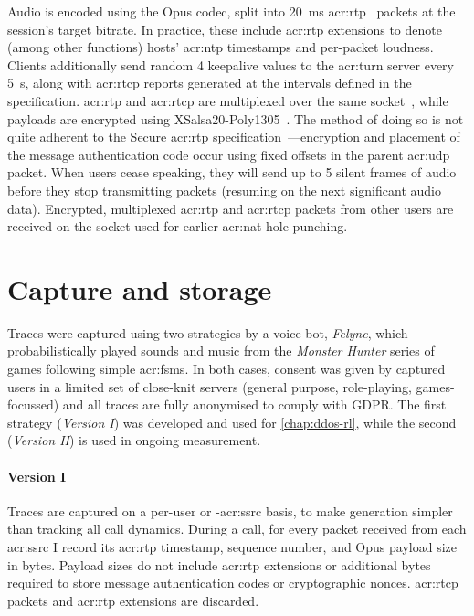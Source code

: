 Audio is encoded using the Opus codec, split into \qty{20}{\milli\second} \gls{acr:rtp}~\parencite{rfc3550} packets at the session's target bitrate.
In practice, these include \gls{acr:rtp} extensions to denote (among other functions) hosts' \gls{acr:ntp} timestamps and per-packet loudness.
Clients additionally send random \qty{4}{\byte} keepalive values to the \gls{acr:turn} server every \qty{5}{\second}, along with \gls{acr:rtcp} reports generated at the intervals defined in the specification.
\gls{acr:rtp} and \gls{acr:rtcp} are multiplexed over the same socket~\parencite{rfc5761}, while payloads are encrypted using XSalsa20-Poly1305~\parencite{xsalsa20,rfc8439}.
The method of doing so is not quite adherent to the Secure \gls{acr:rtp} specification~\parencite{rfc3711}---encryption and placement of the message authentication code occur using fixed offsets in the parent \gls{acr:udp} packet.
When users cease speaking, they will send up to 5 silent frames of audio before they stop transmitting packets (resuming on the next significant audio data).
Encrypted, multiplexed \gls{acr:rtp} and \gls{acr:rtcp} packets from other users are received on the socket used for earlier \gls{acr:nat} hole-punching.

%

\section{Capture and storage}
Traces were captured using two strategies by a voice bot, \emph{Felyne}, which probabilistically played sounds and music from the \emph{Monster Hunter} series of games following simple \glspl{acr:fsm}.
In both cases, consent was given by captured users in a limited set of close-knit servers (general purpose, role-playing, games-focussed) and all traces are fully anonymised to comply with GDPR.
The first strategy (\emph{Version \RN{1}}) was developed and used for \cref{chap:ddos-rl}, while the second (\emph{Version \RN{2}}) is used in ongoing measurement.

\paragraph{Version \RN{1}}
Traces are captured on a per-user or -\gls{acr:ssrc} basis, to make generation simpler than tracking all call dynamics.
During a call, for every packet received from each \gls{acr:ssrc} I record its \gls{acr:rtp} timestamp, sequence number, and Opus payload size in bytes.
Payload sizes do not include \gls{acr:rtp} extensions or additional bytes required to store message authentication codes or cryptographic nonces.
\gls{acr:rtcp} packets and \gls{acr:rtp} extensions are discarded.

